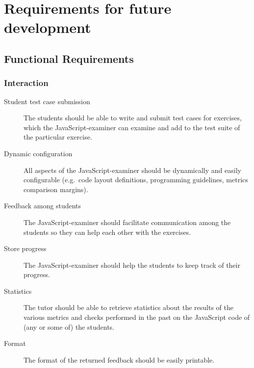 \section{Requirements for future development}
\subsection{Functional Requirements}
\subsubsection{Interaction}
\begin{description}
  \item[Student test case submission] The students should be able to write and
    submit test cases for exercises, which the JavaScript-examiner can examine
    and add to the test suite of the particular exercise.
  \item[Dynamic configuration] All aspects of the JavaScript-examiner should be
    dynamically and easily configurable (e.g.\ code layout definitions,
    programming guidelines, metrics comparison margins).
  \item[Feedback among students] The JavaScript-examiner should facilitate 
    communication among the students so they can help each other with the 
    exercises. 
  \item[Store progress] The JavaScript-examiner should help the students to
    keep track of their progress.
  \item[Statistics] The tutor should be able to retrieve statistics about the
    results of the various metrics and \glspl{check} performed in the past on the
    JavaScript code of (any or some of) the students.
  \item[Format] The format of the returned feedback should be easily printable.
\end{description}

